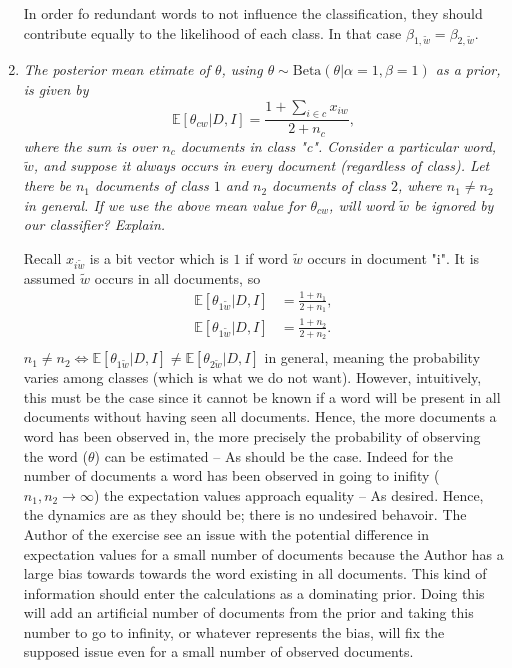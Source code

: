 \begin{example}
\begin{enumerate}
		In order fo redundant words to not influence the classification, they should contribute equally to the likelihood of each class. In that case $\beta_{1,\tilde{w}}=\beta_{2,\tilde{w}}$.
		
		\item \emph{The posterior mean etimate of $\theta$, using $\theta \sim \text{Beta}(\theta|\alpha=1,\beta=1)$ as a prior, is given by}
		\begin{equation}
			\mathbb{E}[\theta_{cw}|D,I] = \frac{1+\sum_{i\in c} x_{iw}}{2+n_c},
		\end{equation}
		\emph{where the sum is over $n_c$ documents in class "c". Consider a particular word, $\tilde{w}$, and suppose it always occurs in every document (regardless of class). Let there be $n_1$ documents of class $1$ and $n_2$ documents of class $2$, where $n_1\neq n_2$ in general. If we use the above mean value for $\theta_{cw}$, will word $\tilde{w}$ be ignored by our classifier? Explain.}\newline
		
		Recall $x_{i\tilde{w}}$ is a bit vector which is $1$ if word $\tilde{w}$ occurs in document "i". It is assumed $\tilde{w}$ occurs in all documents, so
		\begin{equation}
			\begin{split}
				\mathbb{E}[\theta_{1\tilde{w}}|D,I] &= \frac{1+n_1}{2+n_1}, \\ 
				\mathbb{E}[\theta_{1\tilde{w}}|D,I] &= \frac{1+n_2}{2+n_2}. \\ 
			\end{split}
		\end{equation}
		$n_1\neq n_2 \Leftrightarrow \mathbb{E}[\theta_{1\tilde{w}}|D,I] \neq \mathbb{E}[\theta_{2\tilde{w}}|D,I]$ in general, meaning the probability varies among classes (which is what we do not want). However, intuitively, this must be the case since it cannot be known if a word will be present in all documents without having seen all documents. Hence, the more documents a word has been observed in, the more precisely the probability of observing the word ($\theta$) can be estimated -- As should be the case. Indeed for the number of documents a word has been observed in going to inifity ($n_1,n_2\rightarrow \infty$) the expectation values approach equality -- As desired. Hence, the dynamics are as they should be; there is no undesired behavoir. The Author of the exercise see an issue with the potential difference in expectation values for a small number of documents because the Author has a large bias towards towards the word existing in all documents. This kind of information should enter the calculations as a dominating prior. Doing this will add an artificial number of documents from the prior and taking this number to go to infinity, or whatever represents the bias, will fix the supposed issue even for a small number of observed documents.
		

\end{enumerate}
\end{example}
